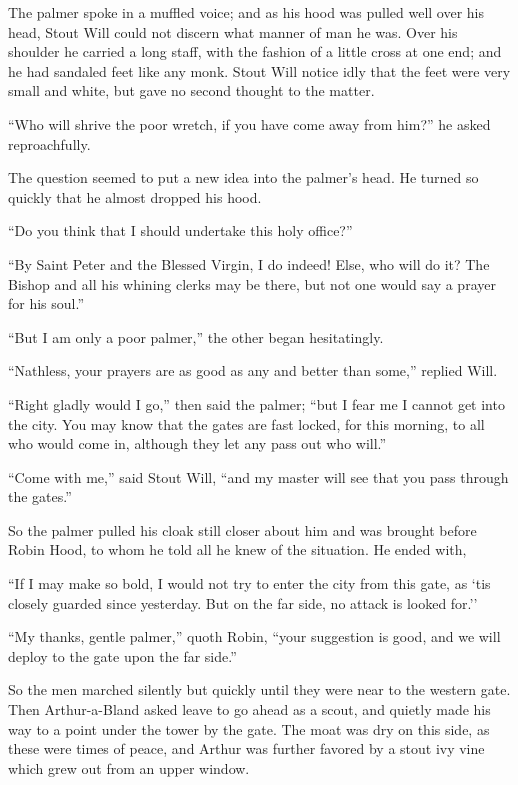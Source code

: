 The palmer spoke in a muffled voice; and as his hood was pulled well
over his head, Stout Will could not discern what manner of man he was.
Over his shoulder he carried a long staff, with the fashion of a little
cross at one end; and he had sandaled feet like any monk. Stout Will
notice idly that the feet were very small and white, but gave no second
thought to the matter.

``Who will shrive the poor wretch, if you have come away from him?'' he
asked reproachfully.

The question seemed to put a new idea into the palmer's head. He turned
so quickly that he almost dropped his hood.

``Do you think that I should undertake this holy office?''

``By Saint Peter and the Blessed Virgin, I do indeed! Else, who will do
it? The Bishop and all his whining clerks may be there, but not one
would say a prayer for his soul.''

``But I am only a poor palmer,'' the other began hesitatingly.

``Nathless, your prayers are as good as any and better than some,''
replied Will.

``Right gladly would I go,'' then said the palmer; ``but I fear me I
cannot get into the city. You may know that the gates are fast locked,
for this morning, to all who would come in, although they let any pass
out who will.''

``Come with me,'' said Stout Will, ``and my master will see that you
pass through the gates.''

So the palmer pulled his cloak still closer about him and was brought
before Robin Hood, to whom he told all he knew of the situation. He
ended with,

``If I may make so bold, I would not try to enter the city from this
gate, as `tis closely guarded since yesterday. But on the far side, no
attack is looked for.''

``My thanks, gentle palmer,'' quoth Robin, ``your suggestion is good,
and we will deploy to the gate upon the far side.''

So the men marched silently but quickly until they were near to the
western gate. Then Arthur-a-Bland asked leave to go ahead as a scout,
and quietly made his way to a point under the tower by the gate. The
moat was dry on this side, as these were times of peace, and Arthur was
further favored by a stout ivy vine which grew out from an upper window.

